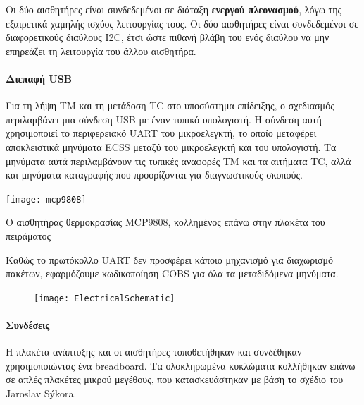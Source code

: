 \documentclass[a4paper,nobib]{tufte-book}
\begin{document}
Οι δύο αισθητήρες είναι συνδεδεμένοι σε διάταξη \textbf{ενεργού πλεονασμού}, λόγω της εξαιρετικά χαμηλής ισχύος λειτουργίας τους. Οι δύο αισθητήρες είναι συνδεδεμένοι σε διαφορετικούς διαύλους \ac{I2C}, έτσι ώστε πιθανή βλάβη του ενός διαύλου να μην επηρεάζει τη λειτουργία του άλλου αισθητήρα.

\paragraph{Διεπαφή \acs{USB}} Για τη λήψη \acl{TM} και τη μετάδοση \acl{TC} στο υποσύστημα επίδειξης, ο σχεδιασμός περιλαμβάνει μια σύνδεση \acl{USB} με έναν τυπικό υπολογιστή. Η σύνδεση αυτή χρησιμοποιεί το περιφερειακό \acs{UART} του μικροελεγκτή, το οποίο μεταφέρει αποκλειστικά μηνύματα \acs{ECSS} μεταξύ του μικροελεγκτή και του υπολογιστή. Τα μηνύματα αυτά περιλαμβάνουν τις τυπικές αναφορές \acs{TM} και τα αιτήματα \acs{TC}, αλλά και μηνύματα καταγραφής που προορίζονται για διαγνωστικούς σκοπούς.

\begin{marginfigure}
	\texttt{[image: mcp9808]}
	\caption{Ο αισθητήρας θερμοκρασίας MCP9808, κολλημένος επάνω στην πλακέτα του πειράματος}
\end{marginfigure}

Καθώς το πρωτόκολλο \acs{UART} δεν προσφέρει κάποιο μηχανισμό για διαχωρισμό πακέτων, εφαρμόζουμε κωδικοποίηση \acs{COBS} \autocite{cheshire_consistent_overhead_1997} για όλα τα μεταδιδόμενα μηνύματα.

\begin{figure}[h]
	\texttt{[image: ElectricalSchematic]}
	\label{fig:schematic}
\end{figure}

\paragraph{Συνδέσεις}
Η πλακέτα ανάπτυξης και οι αισθητήρες τοποθετήθηκαν και συνδέθηκαν χρησιμοποιώντας ένα breadboard. Τα ολοκληρωμένα κυκλώματα κολλήθηκαν επάνω σε απλές πλακέτες μικρού μεγέθους, που κατασκευάστηκαν με βάση το σχέδιο του Jaroslav Sýkora.
\end{document}

